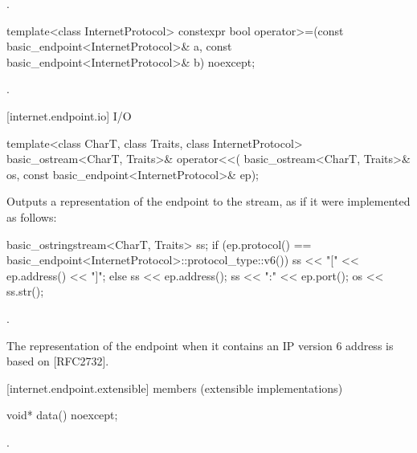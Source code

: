\begin{itemdescr}
\pnum
\returns {}.
\end{itemdescr}

\begin{itemdecl}
template<class InternetProtocol>
  constexpr bool operator>=(const basic_endpoint<InternetProtocol>& a,
                            const basic_endpoint<InternetProtocol>& b) noexcept;
\end{itemdecl}

\begin{itemdescr}
\pnum
\returns {}.
\end{itemdescr}



[internet.endpoint.io]{ I/O}

\begin{itemdecl}
template<class CharT, class Traits, class InternetProtocol>
  basic_ostream<CharT, Traits>& operator<<(
    basic_ostream<CharT, Traits>& os,
    const basic_endpoint<InternetProtocol>& ep);
\end{itemdecl}

\begin{itemdescr}
\pnum
\effects Outputs a representation of the endpoint to the stream, as if it were implemented as follows:
\begin{codeblock}
basic_ostringstream<CharT, Traits> ss;
if (ep.protocol() == basic_endpoint<InternetProtocol>::protocol_type::v6())
  ss << "[" << ep.address() << "]";
else
  ss << ep.address();
ss << ":" << ep.port();
os << ss.str();
\end{codeblock}


\pnum
\returns {}.
\end{itemdescr}

\pnum
\begin{note} The representation of the endpoint when it contains an IP version 6 address is based on [RFC2732]. \end{note}


[internet.endpoint.extensible]{ members (extensible implementations)}

\begin{itemdecl}
void* data() noexcept;
\end{itemdecl}

\begin{itemdescr}
\pnum
\returns {}.
\end{itemdescr}

